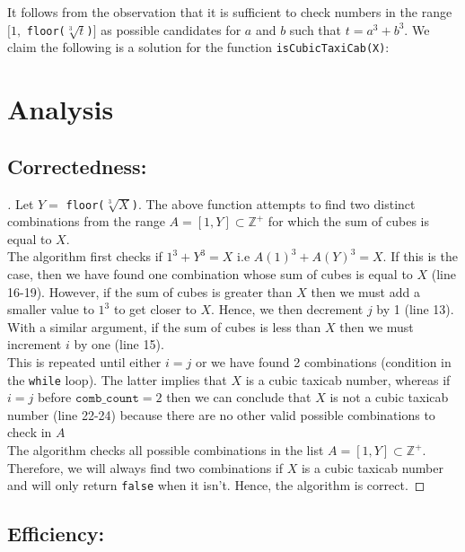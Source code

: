 \documentclass[11pt]{report}
\begin{document}
It follows from the observation that it is sufficient to check numbers in the range $[1,$ \texttt{floor($\sqrt[3]{t}$)}$]$ as possible candidates for $a$ and $b$ such that $t=a^3+b^3$. We claim the following is a solution for the function \texttt{isCubicTaxiCab(X)}: \\



\section{Analysis}
\subsection{Correctedness:}
\begin{proof}[\unskip\nopunct]
Let $Y=$ \texttt{floor($\sqrt[3]{X}$)}. The above function attempts to find two distinct combinations from the range $A=[1,Y]\subset \mathbb{Z^+}$ for which the sum of cubes is equal to $X$. \\ 

The algorithm first checks if $1^3+Y^3=X$ i.e $A(1)^3+A(Y)^3 = X$. If this is the case, then we have found one combination whose sum of cubes is equal to $X$ (line 16-19). However, if the sum of cubes is greater than $X$ then we must add a smaller value to $1^3$ to get closer to $X$. Hence, we then decrement $j$ by 1 (line 13). With a similar argument, if the sum of cubes is less than $X$ then we must increment $i$ by one (line 15). \\

This is repeated until either $i=j$ or we have found 2 combinations (condition in the \texttt{while} loop). The latter implies that $X$ is a cubic taxicab number, whereas if $i=j$ before $\texttt{comb\_count}=2$ then we can conclude that $X$ is not a cubic taxicab number (line 22-24) because there are no other valid possible combinations to check in $A$ \\

The algorithm checks all possible combinations in the list $A = [1,Y] \subset \mathbb{Z^+}$. Therefore, we will always find two combinations if $X$ is a cubic taxicab number and will only return \texttt{false} when it isn't. Hence, the algorithm is correct.
\end{proof}

\subsection{Efficiency:}
\end{document}
